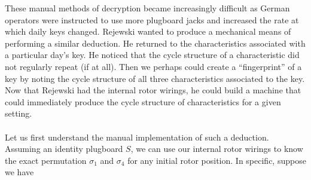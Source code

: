 These manual methods of decryption became increasingly difficult as
German operators were instructed to use more plugboard jacks and
increased the rate at which daily keys changed. Rejewski wanted to
produce a mechanical means of performing a similar deduction. He
returned to the characteristics associated with a particular day's
key. He noticed that the cycle structure of a characteristic did not
regularly repeat (if at all). Then we perhaps could create a
``fingerprint'' of a key by noting the cycle structure of all three
characteristics associated to the key. Now that Rejewski had the
internal rotor wirings, he could build a machine that could
immediately produce the cycle structure of characteristics for a given setting.
\\\\Let us first understand the manual implementation of such a
deduction. Assuming an identity plugboard $S$, we can use our internal
rotor wirings to know the exact permutation $\sigma_1$ and
$\sigma_4$ for any initial rotor position. In specific, suppose we have

